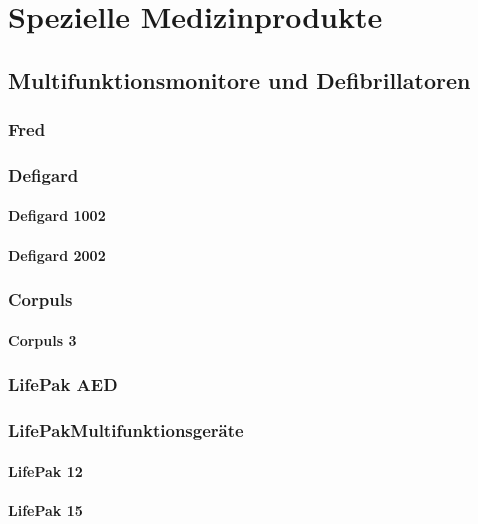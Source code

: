 \chapter{Spezielle Medizinprodukte}
\label{chp:MPG}

\section{Multifunktionsmonitore und Defibrillatoren}

\subsection{Fred}

\subsection{Defigard\texttrademark}

\subsubsection{Defigard 1002}

\subsubsection{Defigard 2002}

\subsection{Corpuls\texttrademark}

\subsubsection{Corpuls 3}

\subsection{LifePak AED}

\subsection{LifePak\texttrademark Multifunktionsgeräte}

\subsubsection{LifePak 12}

\subsubsection{LifePak 15}


